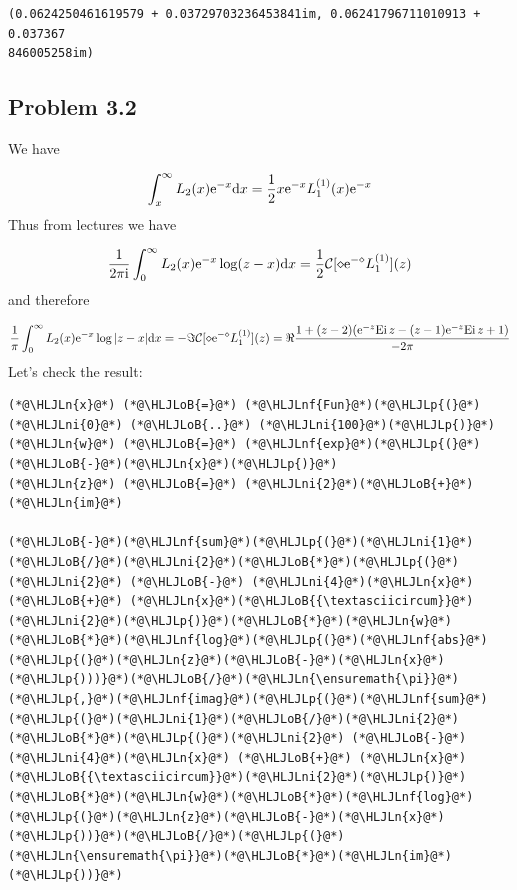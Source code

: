 \documentclass[12pt,a4paper]{article}
\newcommand{\HLJLn}[1]{#1}
\newcommand{\HLJLnf}[1]{\textcolor[RGB]{66,102,213}{#1}}
\newcommand{\HLJLni}[1]{\textcolor[RGB]{59,151,46}{#1}}
\newcommand{\HLJLoB}[1]{\textcolor[RGB]{102,102,102}{\textbf{#1}}}
\newcommand{\HLJLp}[1]{#1}
\def\D{ {\rm d} }
\def\I{ {\rm i} }
\def\E{ {\rm e} }
\def\CC{ {\cal C} }
\def\Ei{ {\rm Ei}\, }
\def\dx{\D x}
\begin{document}
\begin{lstlisting}
(0.0624250461619579 + 0.03729703236453841im, 0.06241796711010913 + 0.037367
846005258im)
\end{lstlisting}


\subsection{Problem 3.2}
We have 

\[
\int_x^\infty L_2(x) \E^{-x} \dx = {1 \over 2} x \E^{-x} L_1^{(1)}(x) \E^{-x}
\]
Thus from lectures we have

\[
{1 \over 2 \pi\I} \int_0^\infty L_2(x) \E^{-x} \log(z-x) \dx = {1 \over 2}\CC[ \diamond \E^{-\diamond} L_1^{(1)}](z)
\]
and therefore

\[
{1 \over \pi} \int_0^\infty L_2(x) \E^{-x} \log|z-x| \dx  = -\Im \CC[ \diamond \E^{-\diamond} L_1^{(1)}](z) = \Re{1  + (z-2) (\E^{-z} \Ei z - (z-1) \E^{-z} \Ei z +1) \over -2 \pi }
\]
Let's check the result:


\begin{lstlisting}
(*@\HLJLn{x}@*) (*@\HLJLoB{=}@*) (*@\HLJLnf{Fun}@*)(*@\HLJLp{(}@*)(*@\HLJLni{0}@*) (*@\HLJLoB{..}@*) (*@\HLJLni{100}@*)(*@\HLJLp{)}@*)
(*@\HLJLn{w}@*) (*@\HLJLoB{=}@*) (*@\HLJLnf{exp}@*)(*@\HLJLp{(}@*)(*@\HLJLoB{-}@*)(*@\HLJLn{x}@*)(*@\HLJLp{)}@*)
(*@\HLJLn{z}@*) (*@\HLJLoB{=}@*) (*@\HLJLni{2}@*)(*@\HLJLoB{+}@*)(*@\HLJLn{im}@*)

(*@\HLJLoB{-}@*)(*@\HLJLnf{sum}@*)(*@\HLJLp{(}@*)(*@\HLJLni{1}@*)(*@\HLJLoB{/}@*)(*@\HLJLni{2}@*)(*@\HLJLoB{*}@*)(*@\HLJLp{(}@*)(*@\HLJLni{2}@*) (*@\HLJLoB{-}@*) (*@\HLJLni{4}@*)(*@\HLJLn{x}@*) (*@\HLJLoB{+}@*) (*@\HLJLn{x}@*)(*@\HLJLoB{{\textasciicircum}}@*)(*@\HLJLni{2}@*)(*@\HLJLp{)}@*)(*@\HLJLoB{*}@*)(*@\HLJLn{w}@*)(*@\HLJLoB{*}@*)(*@\HLJLnf{log}@*)(*@\HLJLp{(}@*)(*@\HLJLnf{abs}@*)(*@\HLJLp{(}@*)(*@\HLJLn{z}@*)(*@\HLJLoB{-}@*)(*@\HLJLn{x}@*)(*@\HLJLp{)))}@*)(*@\HLJLoB{/}@*)(*@\HLJLn{\ensuremath{\pi}}@*)(*@\HLJLp{,}@*)(*@\HLJLnf{imag}@*)(*@\HLJLp{(}@*)(*@\HLJLnf{sum}@*)(*@\HLJLp{(}@*)(*@\HLJLni{1}@*)(*@\HLJLoB{/}@*)(*@\HLJLni{2}@*)(*@\HLJLoB{*}@*)(*@\HLJLp{(}@*)(*@\HLJLni{2}@*) (*@\HLJLoB{-}@*) (*@\HLJLni{4}@*)(*@\HLJLn{x}@*) (*@\HLJLoB{+}@*) (*@\HLJLn{x}@*)(*@\HLJLoB{{\textasciicircum}}@*)(*@\HLJLni{2}@*)(*@\HLJLp{)}@*)(*@\HLJLoB{*}@*)(*@\HLJLn{w}@*)(*@\HLJLoB{*}@*)(*@\HLJLnf{log}@*)(*@\HLJLp{(}@*)(*@\HLJLn{z}@*)(*@\HLJLoB{-}@*)(*@\HLJLn{x}@*)(*@\HLJLp{))}@*)(*@\HLJLoB{/}@*)(*@\HLJLp{(}@*)(*@\HLJLn{\ensuremath{\pi}}@*)(*@\HLJLoB{*}@*)(*@\HLJLn{im}@*)(*@\HLJLp{))}@*)
\end{lstlisting}
\end{document}
